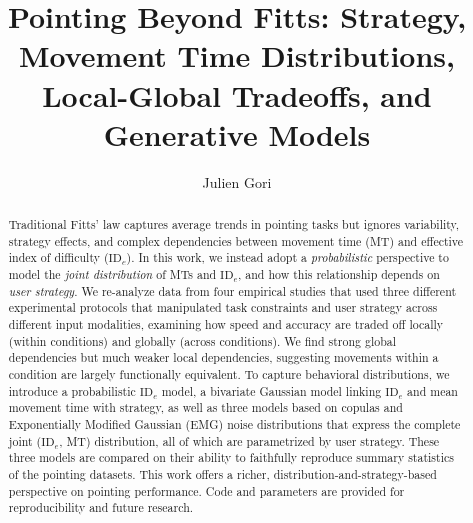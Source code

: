 \documentclass[acmlarge, manuscript,review]{acmart}
\title{Pointing Beyond Fitts: Strategy, Movement Time Distributions, Local-Global Tradeoffs, and Generative Models}
\author{Julien Gori}
\affiliation{%
  \institution{Sorbonne Université, CNRS, Inserm, Institut des Systèmes Intelligents et de Robotique, ISIR}
  \city{F-75005 Paris}
  \country{France}
}
\newcommand{\ide}{\ensuremath{{\text{ID}_e}}\xspace}
\begin{document}
\begin{abstract}
Traditional Fitts' law captures average trends in pointing tasks but ignores variability, strategy effects, and complex dependencies between movement time (MT) and effective index of difficulty (\ide). 
In this work, we instead adopt a \textit{probabilistic} perspective to model the \textit{joint distribution} of MTs and \ide, and how this relationship depends on \textit{user strategy}.
We re-analyze data from four empirical studies that used three different experimental protocols that manipulated task constraints and user strategy across different input modalities, examining how speed and accuracy are traded off locally (within conditions) and globally (across conditions). We find strong global dependencies but much weaker local dependencies, suggesting movements within a condition are largely functionally equivalent.
To capture behavioral distributions, we introduce a probabilistic \ide model, a bivariate Gaussian model linking \ide and mean movement time with strategy, as well as three models based on copulas and Exponentially Modified Gaussian (EMG) noise distributions that express the complete joint (\ide, MT) distribution, all of which are parametrized by user strategy. These three models are compared on their ability to faithfully reproduce summary statistics of the pointing datasets. This work offers a richer, distribution-and-strategy-based perspective on pointing performance. Code and parameters are provided for reproducibility and future research.
\end{abstract}
\maketitle

\end{document}
